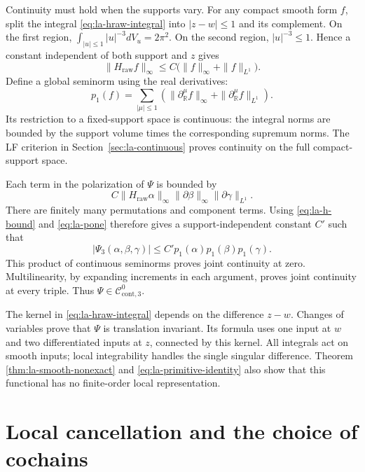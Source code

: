 Continuity must hold when the supports vary. For any compact
smooth form $f$, split the integral
\eqref{eq:la-hraw-integral} into $|z-w|\leq1$ and its
complement. On the first region,
$\int_{|u|\leq1}|u|^{-3}dV_u=2\pi^2$.
On the second region, $|u|^{-3}\leq1$. Hence a constant
independent of both support and $z$ gives
\begin{equation}\label{eq:la-h-bound}
 \|H_{\mathrm{raw}}f\|_\infty
 \leq C\bigl(\|f\|_\infty+\|f\|_{L^1}\bigr).
\end{equation}
Define a global seminorm using the real derivatives:
\begin{equation}\label{eq:la-pone}
 p_1(f)=\sum_{|\mu|\leq1}
       \left(\|\partial_{\mathbb R}^{\mu}f\|_\infty
                  +\|\partial_{\mathbb R}^{\mu}f\|_{L^1}\right).
\end{equation}
Its restriction to a fixed-support space is continuous:
the integral norms are bounded by the support volume times
the corresponding supremum norms. The LF criterion in
Section~\ref{sec:la-continuous} proves continuity on the full
compact-support space.

Each term in the polarization of $\Psi$ is bounded by
\[
 C\|H_{\mathrm{raw}}\alpha\|_\infty
       \|\partial\beta\|_\infty
       \|\partial\gamma\|_{L^1}.
\]
There are finitely many permutations and component terms.
Using \eqref{eq:la-h-bound} and
\eqref{eq:la-pone} therefore gives a support-independent
constant $C'$ such that
\begin{equation}\label{eq:la-joint-bound}
 |\Psi_3(\alpha,\beta,\gamma)|
     \leq C'p_1(\alpha)p_1(\beta)p_1(\gamma).
\end{equation}
This product of continuous seminorms proves joint continuity
at zero. Multilinearity, by expanding increments in each
argument, proves joint continuity at every triple.
Thus $\Psi\in\mathcal C_{\mathrm{cont},3}^0$.

The kernel in \eqref{eq:la-hraw-integral} depends on the
difference $z-w$. Changes of variables prove that $\Psi$
is translation invariant. Its formula uses one input at
$w$ and two differentiated inputs at $z$, connected by this
kernel. All integrals act on smooth inputs; local integrability
handles the single singular difference. Theorem
\ref{thm:la-smooth-nonexact} and
\eqref{eq:la-primitive-identity} also show that this functional
has no finite-order local representation.

\section{Local cancellation and the choice of cochains}
\label{sec:la-consequence}

